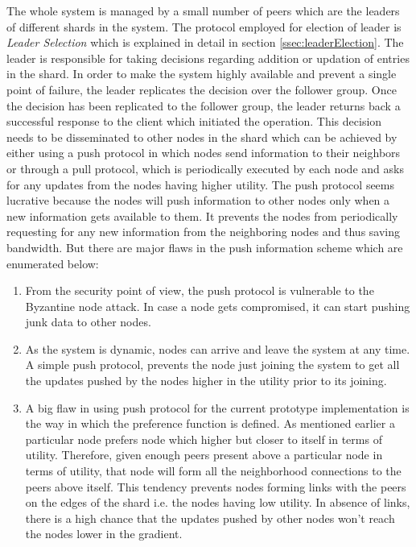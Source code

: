 \documentclass[a4paper,11pt]{kth-mag}
\begin{document}
The whole system is managed by a small number of peers which are the leaders of different shards in the system. The protocol employed for election of leader is \textit{Leader Selection} which is explained in detail in section \ref{ssec:leaderElection}. The leader is responsible for taking decisions regarding addition or updation of entries in the shard. In order to make the system highly available and prevent a single point of failure, the leader replicates the decision over the follower group. Once the decision has been replicated to the follower group, the leader returns back a successful response to the client which initiated the operation. This decision needs to be disseminated to other nodes in the shard which can be achieved by either using a push protocol in which nodes send information to their neighbors or through a pull protocol, which is periodically executed by each node and asks for any updates from the nodes having higher utility. The push protocol seems lucrative because the nodes will push information to other nodes only when a new information gets available to them. It prevents the nodes from periodically requesting for any new information from the neighboring nodes and thus saving bandwidth. But there are major flaws in the push information scheme which are enumerated below:

\begin{enumerate}

\item From the security point of view, the push protocol is vulnerable to the Byzantine node attack. In case a node gets compromised, it can start pushing junk data to other nodes.


\item As the system is dynamic, nodes can arrive and leave the system at any time. A simple push protocol, prevents the node just joining the system to get all the updates pushed by the nodes higher in the utility prior to its joining.

\item A big flaw in using push protocol for the current prototype implementation is the way in which the preference function is defined. As mentioned earlier a particular node prefers node which higher but closer to itself in terms of utility. Therefore, given enough peers present above a particular node in terms of utility, that node will form all the neighborhood connections to the peers above itself. This tendency prevents nodes forming links with the peers on the edges of the shard i.e. the nodes having low utility. In absence of links, there is a high chance that the updates pushed by other nodes won't reach the nodes lower in the gradient.

\end{enumerate}
\end{document}

